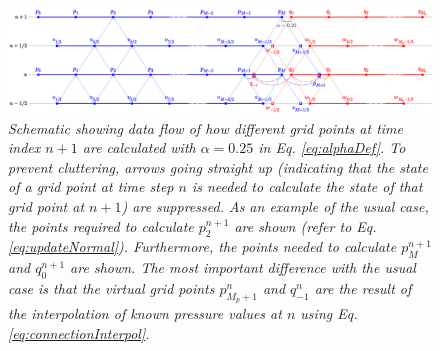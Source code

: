 \begin{figure}[t]
    \centering
    \includegraphics[width = \textwidth]{Figures/tromboneSchematic.eps}
    \caption{\it Schematic showing data flow of how different grid points at time index $n+1$ are calculated with $\alpha = 0.25$ in Eq. \eqref{eq:alphaDef}. To prevent cluttering, arrows going straight up (indicating that the state of a grid point at time step $n$ is needed to calculate the state of that grid point at $n+1$) are suppressed. As an example of the usual case, the points required to calculate $p_2^{n+1}$ are shown (refer to Eq. \eqref{eq:updateNormal}). Furthermore, the points needed to calculate $p_{M}^{n+1}$ and $q_0^{n+1}$ are shown. The most important difference with the usual case is that the virtual grid points $p_{M_p+1}^n$ and $q_{-1}^n$ 
    are the result of the interpolation of known pressure values at $n$ using Eq. \eqref{eq:connectionInterpol}. %
    \label{fig:dynamicGridSchematic}}
\end{figure}

